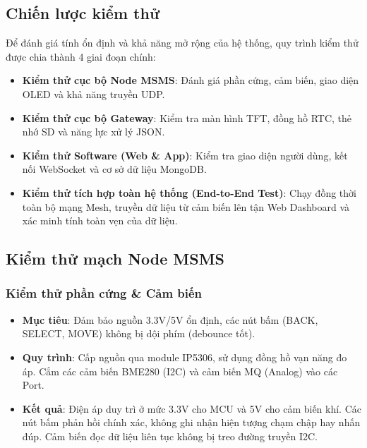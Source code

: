 \documentclass{article} %
\begin{document}
\subsection{Chiến lược kiểm thử}

Để đánh giá tính ổn định và khả năng mở rộng của hệ thống, quy trình kiểm thử được chia thành 4 giai đoạn chính:
\begin{itemize}
    \item \textbf{Kiểm thử cục bộ Node MSMS}: Đánh giá phần cứng, cảm biến, giao diện OLED và khả năng truyền UDP.
    \item \textbf{Kiểm thử cục bộ Gateway}: Kiểm tra màn hình TFT, đồng hồ RTC, thẻ nhớ SD và năng lực xử lý JSON.
    \item \textbf{Kiểm thử Software (Web \& App)}: Kiểm tra giao diện người dùng, kết nối WebSocket và cơ sở dữ liệu MongoDB.
    \item \textbf{Kiểm thử tích hợp toàn hệ thống (End-to-End Test)}: Chạy đồng thời toàn bộ mạng Mesh, truyền dữ liệu từ cảm biến lên tận Web Dashboard và xác minh tính toàn vẹn của dữ liệu.
\end{itemize}

\subsection{Kiểm thử mạch Node MSMS}

\subsubsection{Kiểm thử phần cứng \& Cảm biến}
\begin{itemize}
    \item \textbf{Mục tiêu}: Đảm bảo nguồn 3.3V/5V ổn định, các nút bấm (BACK, SELECT, MOVE) không bị dội phím (debounce tốt).
    \item \textbf{Quy trình}: Cấp nguồn qua module IP5306, sử dụng đồng hồ vạn năng đo áp. Cắm các cảm biến BME280 (I2C) và cảm biến MQ (Analog) vào các Port.
    \item \textbf{Kết quả}: Điện áp duy trì ở mức 3.3V cho MCU và 5V cho cảm biến khí. Các nút bấm phản hồi chính xác, không ghi nhận hiện tượng chạm chập hay nhấn đúp. Cảm biến đọc dữ liệu liên tục không bị treo đường truyền I2C.
\end{itemize}
\end{document}
